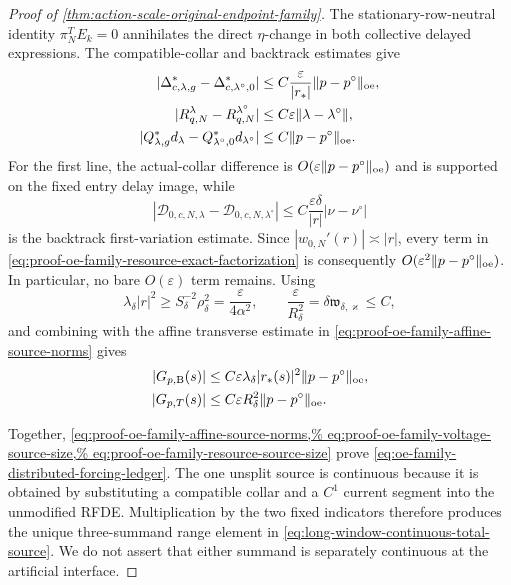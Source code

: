 \begin{proof}[Proof of
\cref{thm:action-scale-original-endpoint-family}]
The stationary-row-neutral identity \(\pi_N^TE_k=0\) annihilates the
direct \(\eta\)-change in both collective delayed expressions.  The
compatible-collar and backtrack estimates give
\begin{align}
 |\Delta_{c,\lambda,g}^*
       -\Delta_{c,\lambda^\circ,0}^*|
 &\le C\frac{\varepsilon}{|r_*|}
       \|p-p^\circ\|_{\rm oe},\notag\\
 |R_{q,N}^{\lambda}-R_{q,N}^{\lambda^\circ}|
 &\le C\varepsilon\|\lambda-\lambda^\circ\|,\notag\\
 |Q_{\lambda,g}^*d_\lambda
       -Q_{\lambda^\circ,0}^*d_{\lambda^\circ}|
 &\le C\|p-p^\circ\|_{\rm oe}.                 \label{eq:proof-oe-family-resource-factor-bounds}
\end{align}
For the first line, the actual-collar difference is
\(O(\varepsilon\|p-p^\circ\|_{\rm oe})\) and is supported on the fixed
entry delay image, while
\[
 |\mathcal D_{0,c,N,\lambda}
       -\mathcal D_{0,c,N,\lambda^\circ}|
 \le C\frac{\varepsilon\delta}{|r|}
        |\nu-\nu^\circ|
\]
is the backtrack first-variation estimate.  Since
\(|w_{0,N}'(r)|\asymp|r|\), every term in
\cref{eq:proof-oe-family-resource-exact-factorization} is consequently
\(O(\varepsilon^2\|p-p^\circ\|_{\rm oe})\).  In particular, no bare
\(O(\varepsilon)\) term remains.  Using
\[
 \lambda_\delta|r|^2
 \ge S_\delta^{-2}\rho_\delta^2
 =\frac{\varepsilon}{4\alpha^2},
 \qquad
 \frac{\varepsilon}{R_\delta^2}
 =\delta\mathfrak w_{\delta,\varkappa}\le C,
\]
and combining with the affine transverse estimate in
\cref{eq:proof-oe-family-affine-source-norms} gives
\begin{align}
 |G_{p,{\rm B}}(s)|
 &\le C\varepsilon\lambda_\delta |r_*(s)|^2
       \|p-p^\circ\|_{\rm oe},\notag\\
 |G_{p,T}(s)|
 &\le C\varepsilon R_\delta^2
       \|p-p^\circ\|_{\rm oe}.                 \label{eq:proof-oe-family-resource-source-size}
\end{align}

Together,
\cref{eq:proof-oe-family-affine-source-norms,%
eq:proof-oe-family-voltage-source-size,%
eq:proof-oe-family-resource-source-size} prove
\cref{eq:oe-family-distributed-forcing-ledger}.  The one unsplit source is
continuous because it is obtained by substituting a compatible collar and
a \(C^1\) current segment into the unmodified RFDE.  Multiplication by the
two fixed indicators therefore produces the unique three-summand range
element in \cref{eq:long-window-continuous-total-source}.  We do not assert
that either summand is separately continuous at the artificial interface.


\end{proof}
